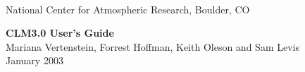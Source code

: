 \documentclass[]{article}
\begin{document}
 \newenvironment{Ventry}[1]%
   {\begin{list}{}{\renewcommand{\makelabel}[1]{\textsf{##1:}\hfil}%
      \settowidth{\labelwidth}{\textsf{#1:}}%
      \setlength{\leftmargin}{4.2cm}%
      \setlength{\labelwidth}{2.7cm}%
      \setlength{\itemsep}{0pt}%
      \setlength{\parsep}{0pt}}}%
   {\end{list}}

\begin{titlepage}

 \\
\noindent National Center for Atmospheric Research, Boulder, CO \\
\vspace{2in}

\begin{center}
{\Large
  {\bf CLM3.0 User's Guide} \\
  \vspace{0.5in}
  Mariana Vertenstein, Forrest Hoffman, Keith Oleson and Sam Levis \\
}
  January 2003
\end{center}

\end{titlepage}

\tableofcontents

\newpage












\end{document}
